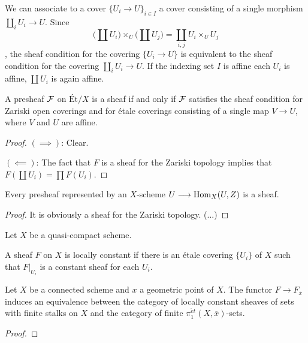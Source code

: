 \begin{remark}
 We can associate to a cover $\{U_i \to U\}_{i \in I}$ a cover consisting of a single morphism $\coprod_i U_i \to U$. Since
  \[
    \bigl(\coprod U_i \bigr) \times_U \bigl( \coprod U_j \bigr) = \coprod_{i,j} U_i \times_U U_j
  \], the sheaf condition for the covering $\{U_i \to U\}$ is equivalent to the sheaf condition for the covering $\coprod_i U_i \to U$. If the indexing set $I$ is affine each $U_i$ is affine, $\coprod U_i$ is again affine.
\end{remark}

\begin{theorem}
  A presheaf $\mathcal{F}$ on $\text{\'Et}/X$ is a sheaf if and only if $\mathcal{F}$ satisfies the sheaf condition for Zariski open coverings and for \'etale coverings consisting of a single map $V \to U$, where $V$ and $U$ are affine.
\end{theorem}

\begin{proof}
  $(\implies)$: Clear.\par
  $(\impliedby)$: The fact that $F$ is a sheaf for the Zariski topology implies that $F(\coprod U_i) = \prod F(U_i)$.

\end{proof}
\begin{corollary}
  Every presheaf represented by an $X$-scheme $U \longrightarrow \operatorname{Hom}_X(U,Z)$ is a sheaf. 
\end{corollary}
\begin{proof}
  It is obviously a sheaf for the Zariski topology. (...)
\end{proof}

\begin{definition}
  Let $X$ be a quasi-compact scheme. 
\end{definition}

\begin{definition}
  A sheaf $F$ on $X$ is locally constant if there is an \'etale covering $\{U_i\}$ of $X$ such that $F|_{U_i}$ is a constant sheaf for each $U_i$.
\end{definition}

\begin{proposition}
  Let $X$ be a connected scheme and $x$ a geometric point of $X$. The functor $F \to F_{\overline{x}}$ induces an equivalence between the category of locally constant sheaves of sets with finite stalks on $X$ and the category of finite $\pi_1^{\acute{e}t}(X,\overline{x})$-sets.
\end{proposition}
\begin{proof}
  
\end{proof}

